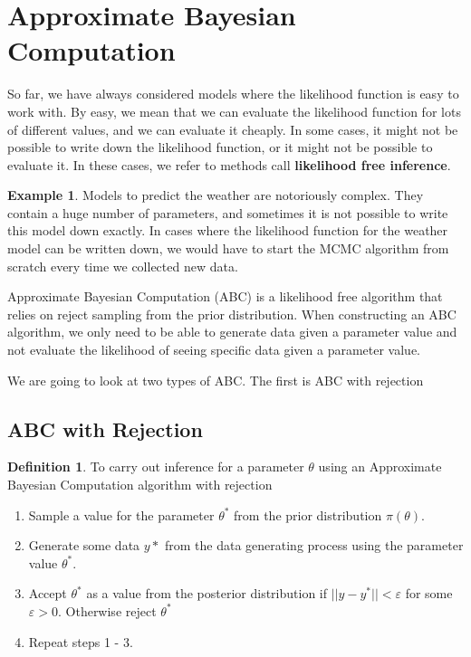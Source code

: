 \documentclass[
]{book}
\providecommand{\tightlist}{%
  \setlength{\itemsep}{0pt}\setlength{\parskip}{0pt}}
\theoremstyle{definition}
\newtheorem{definition}{Definition}[chapter]
\theoremstyle{definition}
\newtheorem{example}{Example}[chapter]
\theoremstyle{definition}
\theoremstyle{definition}
\theoremstyle{remark}
\begin{document}
\section{Approximate Bayesian Computation}\label{approximate-bayesian-computation}

So far, we have always considered models where the likelihood function is easy to work with. By easy, we mean that we can evaluate the likelihood function for lots of different values, and we can evaluate it cheaply. In some cases, it might not be possible to write down the likelihood function, or it might not be possible to evaluate it. In these cases, we refer to methods call \textbf{likelihood free inference}.

\begin{example}
Models to predict the weather are notoriously complex. They contain a huge number of parameters, and sometimes it is not possible to write this model down exactly. In cases where the likelihood function for the weather model can be written down, we would have to start the MCMC algorithm from scratch every time we collected new data.
\end{example}

Approximate Bayesian Computation (ABC) is a likelihood free algorithm that relies on reject sampling from the prior distribution. When constructing an ABC algorithm, we only need to be able to generate data given a parameter value and not evaluate the likelihood of seeing specific data given a parameter value.

We are going to look at two types of ABC. The first is ABC with rejection

\subsection{ABC with Rejection}\label{abc-with-rejection}

\begin{definition}

To carry out inference for a parameter \(\theta\) using an Approximate Bayesian Computation algorithm with rejection

\begin{enumerate}
\def\labelenumi{\arabic{enumi}.}
\tightlist
\item
  Sample a value for the parameter \(\theta^*\) from the prior distribution \(\pi(\theta)\).
\item
  Generate some data \(y*\) from the data generating process using the parameter value \(\theta^*\).
\item
  Accept \(\theta^*\) as a value from the posterior distribution if \(||y - y^*|| < \varepsilon\) for some \(\varepsilon > 0\). Otherwise reject \(\theta^*\)
\item
  Repeat steps 1 - 3.
\end{enumerate}

\end{definition}
\end{document}
